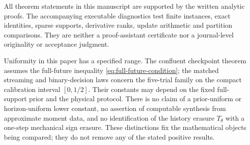 All theorem statements in this manuscript are supported by the written
analytic proofs. The accompanying executable diagnostics test finite
instances, exact identities, sparse supports, derivative ranks, update
arithmetic and partition comparisons. They are neither a proof-assistant
certificate nor a journal-level originality or acceptance judgment.

Uniformity in this paper has a specified range. The confluent checkpoint
theorem assumes the full-future inequality \eqref{eq:full-future-condition};
the matched streaming and binary-decision laws concern the five-trial
family on the compact calibration interval $[0,1/2]$. Their constants
may depend on the fixed full-support prior and the physical protocol.
There is no claim of a prior-uniform or horizon-uniform lower constant,
no assertion of computable synthesis from approximate moment data, and
no identification of the history erasure $T_\theta$ with a one-step
mechanical sign erasure. These distinctions fix the mathematical objects
being compared; they do not remove any of the stated positive results.
